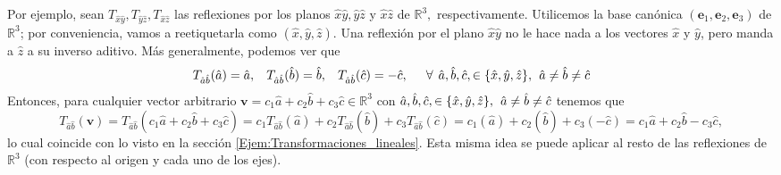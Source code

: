 \documentclass[12pt]{article}
\begin{document}
Por ejemplo, sean $T_{\hat{x}\hat{y}},T_{\hat{y}\hat{z}},T_{\hat{x}\hat{z}}$ las reflexiones por los planos $\hat{x}\hat{y},\hat{y}\hat{z}$ y $\hat{x}\hat{z}$ de $\mathbb{R}^3,$ respectivamente. Utilicemos la base canónica $(\mathbf{e}_1,\mathbf{e}_2,\mathbf{e}_3)$ de $\mathbb{R}^3$; por conveniencia, vamos a reetiquetarla como $(\hat{x},\hat{y},\hat{z})$. Una reflexión por el plano $\hat{x}\hat{y}$ no le hace nada a los vectores $\hat{x}$ y $\hat{y}$, pero manda a $\hat{z}$ a su inverso aditivo. Más generalmente, podemos ver que \[T_{\hat{a}\hat{b}}(\hat{a})=\hat{a}, \hspace{3mm} T_{\hat{a}\hat{b}}(\hat{b})=\hat{b}, \hspace{3mm} T_{\hat{a}\hat{b}}(\hat{c})=-\hat{c}, \hspace{5mm}\forall\hspace{1.5mm} \hat{a},\hat{b},\hat{c}, \in \{\hat{x},\hat{y},\hat{z}\},\hspace{1.5mm} \hat{a}\neq\hat{b}\neq\hat{c} \] Entonces, para cualquier vector arbitrario $\mathbf{v}=c_1\hat{a}+c_2\hat{b}+c_3\hat{c}\in\mathbb{R}^3$ con $\hat{a},\hat{b},\hat{c}, \in \{\hat{x},\hat{y},\hat{z}\},\hspace{1.5mm} \hat{a}\neq\hat{b}\neq\hat{c}$ tenemos que \[T_{\hat{a}\hat{b}}(\mathbf{v})=T_{\hat{a}\hat{b}}(c_1\hat{a}+c_2\hat{b}+c_3\hat{c})=c_1T_{\hat{a}\hat{b}}(\hat{a})+c_2T_{\hat{a}\hat{b}}(\hat{b})+c_3T_{\hat{a}\hat{b}}(\hat{c})=c_1(\hat{a})+c_2(\hat{b})+c_3(-\hat{c})=c_1\hat{a}+c_2\hat{b}-c_3\hat{c},\] lo cual coincide con lo visto en la sección \ref{Ejem:Transformaciones_lineales}. Esta misma idea se puede aplicar al resto de las reflexiones de $\mathbb{R}^3$ (con respecto al origen y cada uno de los ejes).
\end{document}

